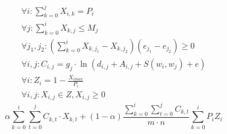 \documentclass{article}
\begin{document}
\begin{align}
    \forall i:\sum_{k=0}^{j}X_{i,k} = P_i\\
    \forall j:\sum_{k=0}^{i}X_{k,j} \leq M_j\\
    \forall j_1,j_2:(\sum_{k=0}^{i}X_{k,j_1} - X_{k,j_2})(e_{j_1}-e_{j_2}) \geq 0\\
    \forall i,j:C_{i,j} = g_j \cdot \ln(d_{i,j} + A_{i,j} + S(w_i,w_j) + e)\\
    \forall i:Z_i = 1 - \frac{X_{imax}}{P_i}\\
    \forall i,j:X_{i,j} \in Z,X_{i,j}\geq 0
\end{align}
\[\alpha \sum_{k=0}^{i}\sum_{t=0}^{j}C_{k,t}\cdot X_{k,t} + (1-\alpha)\frac{\sum_{k=0}^{i}\sum_{t=0}^{j}C_{k,t}}{m\cdot n}\sum_{k=0}^{i}P_i Z_i \]
\end{document}
